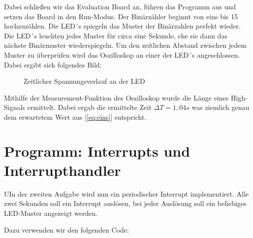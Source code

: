\documentclass{article}
\begin{document}
Dabei schließen wir das Evaluation Board an, führen das Programm aus und setzen das Board in den Run-Modus. Der Binärzähler beginnt von eins bis 15 hochzuzählen. Die LED´s spiegeln das Muster der Binärzahlen perfekt wieder. Die LED´s leuchten jedes Muster für circa eine Sekunde, ehe sie dann das nächste Binärmuster wiederspiegeln. Um den zeitlichen Abstand zwischen jedem Muster zu überprüfen wird das Oszilloskop an einer der LED´s angeschlossen. Dabei ergibt sich folgendes Bild: 

\begin{figure}[h]
    \centering
    \caption{Zeitlicher Spannungsverlauf an der LED}
\end{figure}

Mithilfe der Measurement-Funktion des Oszilloskop wurde die Länge eines High-Signals ermittelt. Dabei ergab die ermittelte Zeit $\Delta T = 1,04s$ was ziemlich genau dem erwartetem Wert aus [\ref{eq:eins}] entspricht.

\newpage

\section{Programm: Interrupts und Interrupthandler}


\begin{task}
  UIn der zweiten Aufgabe wird nun ein periodischer Interrupt implementiert. Alle zwei Sekunden soll ein Interrupt auslösen, bei jeder Auslösung soll ein beliebiges LED-Muster angezeigt werden.
\end{task}

Dazu verwenden wir den folgenden Code:
\end{document}
